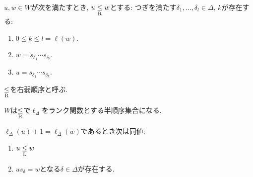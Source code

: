 \begin{definition}
  $u,w\in W$が次を満たすとき, $u\mathrel{\underset{\text{R}}{\leq}} w$とする:
  つぎを満たす$\delta_1,\ldots,\delta_l\in\Delta$, $k$が存在する:
  \begin{enumerate}
    \item $0\leq k\leq l=\ell(w)$.
    \item $w=s_{\delta_1}\cdots s_{\delta_l}$.
    \item $u=s_{\delta_1}\cdots s_{\delta_k}$.
  \end{enumerate}
  $\mathrel{\underset{\text{R}}{\leq}}$を右弱順序と呼ぶ.
\end{definition}
\begin{prop}
  $W$は$\mathrel{\underset{\text{R}}{\leq}}$で$\ell_\Delta$をランク関数とする半順序集合になる.
\end{prop}
\begin{prop}
  $\ell_\Delta(u)+1=\ell_\Delta(w)$であるとき次は同値:
  \begin{enumerate}
  \item $u\mathrel{\underset{\text{L}}{\leq}} w$
  \item $us_{\delta}= w$となる$\delta\in\Delta$が存在する.
  \end{enumerate}
\end{prop}

